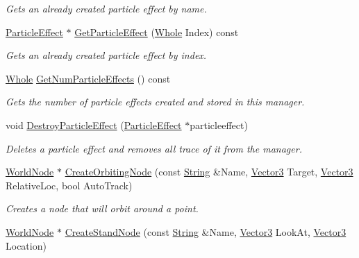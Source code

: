 \begin{DoxyCompactItemize}
\begin{DoxyCompactList}\small\item\em Gets an already created particle effect by name. \item\end{DoxyCompactList}\item 
\hyperlink{classphys_1_1ParticleEffect}{ParticleEffect} $\ast$ \hyperlink{classphys_1_1SceneManager_acfe014153bbda04b181959774536aec5}{GetParticleEffect} (\hyperlink{namespacephys_a460f6bc24c8dd347b05e0366ae34f34a}{Whole} Index) const 
\begin{DoxyCompactList}\small\item\em Gets an already created particle effect by index. \item\end{DoxyCompactList}\item 
\hyperlink{namespacephys_a460f6bc24c8dd347b05e0366ae34f34a}{Whole} \hyperlink{classphys_1_1SceneManager_aad3e20c92eef52372671450704a2ac51}{GetNumParticleEffects} () const 
\begin{DoxyCompactList}\small\item\em Gets the number of particle effects created and stored in this manager. \item\end{DoxyCompactList}\item 
void \hyperlink{classphys_1_1SceneManager_addce8f82a6758db345568dbd4a88f5b9}{DestroyParticleEffect} (\hyperlink{classphys_1_1ParticleEffect}{ParticleEffect} $\ast$particleeffect)
\begin{DoxyCompactList}\small\item\em Deletes a particle effect and removes all trace of it from the manager. \item\end{DoxyCompactList}\item 
\hyperlink{classphys_1_1WorldNode}{WorldNode} $\ast$ \hyperlink{classphys_1_1SceneManager_ad86be1c140e04c7579af80c1e33150fd}{CreateOrbitingNode} (const \hyperlink{namespacephys_aa03900411993de7fbfec4789bc1d392e}{String} \&Name, \hyperlink{classphys_1_1Vector3}{Vector3} Target, \hyperlink{classphys_1_1Vector3}{Vector3} RelativeLoc, bool AutoTrack)
\begin{DoxyCompactList}\small\item\em Creates a node that will orbit around a point. \item\end{DoxyCompactList}\item 
\hyperlink{classphys_1_1WorldNode}{WorldNode} $\ast$ \hyperlink{classphys_1_1SceneManager_afb93b25cdd669066481e7bc81c33674a}{CreateStandNode} (const \hyperlink{namespacephys_aa03900411993de7fbfec4789bc1d392e}{String} \&Name, \hyperlink{classphys_1_1Vector3}{Vector3} LookAt, \hyperlink{classphys_1_1Vector3}{Vector3} Location)

\end{DoxyCompactItemize}
